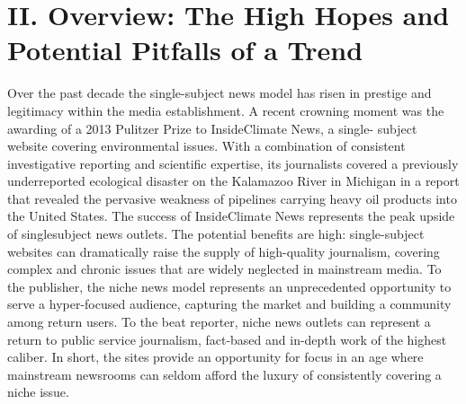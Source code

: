 \chapter{II. Overview: The High Hopes and Potential Pitfalls of a Trend}
Over the past decade the single-subject news model has risen in prestige
and legitimacy within the media establishment. A recent crowning moment
was the awarding of a 2013 Pulitzer Prize to InsideClimate News, a single-
subject website covering environmental issues. With a combination of
consistent investigative reporting and scientific expertise, its journalists
covered a previously underreported ecological disaster on the Kalamazoo
River in Michigan in a report that revealed the pervasive weakness of pipelines
carrying heavy oil products into the United States.
The success of InsideClimate News represents the peak upside of singlesubject
news outlets. The potential benefits are high: single-subject websites
can dramatically raise the supply of high-quality journalism, covering complex
and chronic issues that are widely neglected in mainstream media. To
the publisher, the niche news model represents an unprecedented opportunity
to serve a hyper-focused audience, capturing the market and building
a community among return users. To the beat reporter, niche news outlets
can represent a return to public service journalism, fact-based and in-depth
work of the highest caliber. In short, the sites provide an opportunity for
focus in an age where mainstream newsrooms can seldom afford the luxury
of consistently covering a niche issue.


